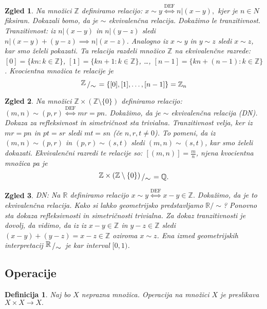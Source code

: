 \documentclass[10pt, a4paper]{article}
\newtheorem{defi}{Definicija}[section]
\newenvironment{noticeB}{%
  \tcolorbox[%
  notitle,
  empty,
  enhanced,  %
  breakable,
  coltext=black,
  colback=white, 
  fontupper=\rmfamily,
  parbox=false,
  noparskip,
  sharp corners,
  boxrule=-1pt,  %
  frame hidden,
  left=7pt,  %
  right=7pt,
  top=5pt,
  bottom=5pt,
  before skip=2.5ex plus 2pt,
  after skip=2.5ex plus 2pt,
  borderline west = {1.5pt}{-0.1pt}{blue!30!black}, %
  overlay unbroken and last={%
    \draw[color=black, line width=1.25pt]
    ($(frame.south west)+(1.pt, -0.1pt)$) -- ++(2em, 0);
  }
  ]}
{\endtcolorbox}
\newenvironment{definicija}{\begin{defi}\begin{noticeB}}{%
    \end{noticeB}\end{defi}}
\newtheorem{zgled}{Zgled}[section]
\newcommand{\Z}{\mathbb {Z}}
\newcommand{\Q}{\mathbb {Q}}
\newcommand{\R}{\mathbb {R}}
\newcommand{\quot}[2]{{\raisebox{.2em}{$#1$}\left/\raisebox{-.2em}{$#2$}\right.}}
\begin{document}
\begin{zgled}
    Na množici $\Z$ definiramo relacijo:
    $x \sim y \stackrel{\text{DEF}}{\iff} n \big| (x-y),$ kjer je $n \in N$ fiksiran.
        Dokazali bomo, da je $\sim$ ekvivalenčna relacija.
        Dokažimo le tranzitivnost.
        Tranzitivnost: iz 
            $n \big| (x-y)$ in $n \big| (y-z)$ sledi $n \big| (x-y) + (y-z) \implies n \big| (x-z)$.
            Analogno iz $x \sim y$ in $y \sim z$ sledi $x \sim z$, kar smo želeli pokazati.
        Ta relacija razdeli množico $\Z$ na ekvivalenčne razrede: $[0] = \{kn: k \in \Z\}$, $[1] = \{kn + 1: k \in \Z\}$, \dots, $[n-1] = \{kn + (n- 1): k \in \Z\}$.
        Kvocientna množica te relacije je 
        $$\quot{\Z}{\sim} = \{[0], [1], \dots, [n-1]\} = \Z_n$$
\end{zgled}
\vspace{-3mm}
\begin{zgled}
    Na množici $\Z \times (\Z \setminus \{0\})$ definiramo relacijo:
    $(m,n) \sim (p,r) \stackrel{\text{DEF}}{\iff} mr = pn$.
    Dokažimo, da je $\sim$ ekvivalenčna relacija (DN).
    Dokaza za refleksivnost in simetričnost sta trivialna.
    Tranzitivnost velja, ker iz $mr = pn$ in $pt = sr$ sledi $mt = sn$ (če $n,r,t \neq 0$).
    To pomeni, da iz $(m,n) \sim (p,r)$ in $(p, r) \sim (s, t)$ sledi $(m,n) \sim (s,t)$, kar smo želeli dokazati.
        Ekvivalenčni razredi te relacije so:
        $
            [(m,n)] = \frac{m}{n}
        $,
        njena kvocientna množica pa je 
        $$\quot{\Z \times(\Z \setminus \{0\})}{\sim} = \Q.$$
\end{zgled}
\vspace{-3mm}
\begin{zgled}
    DN: Na $\R$ definiramo relacijo
    $x \sim y \stackrel{\text{DEF}}{\iff} x-y \in \Z.$
    Dokažimo, da je to ekvivalenčna relacija. Kako si lahko geometrijsko predstavljamo $\R \big/ \sim$?
    Ponovno sta dokaza refleksivnosti in simetričnosti trivialna.
    Za dokaz tranzitivnosti je dovolj, da vidimo, da iz 
    iz $x-y \in \Z$ in $y-z \in \Z$ sledi $(x-y) + (y-z) = x-z \in \Z$ oziroma $x \sim z$.
    Ena izmed geometrijskih interpretacij $\quot{\R}{\sim}$ je kar interval $[0,1)$.
\end{zgled}

\subsection{Operacije}

\begin{definicija}
    Naj bo $X$ neprazna množica. Operacija na množici $X$ je preslikava
    $X \times X \rightarrow X.$
\end{definicija}
\end{document}
